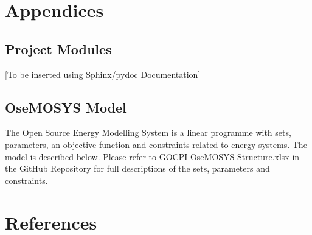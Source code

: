 \documentclass[12pt]{article}
\begin{document}
\newpage
\section{Appendices}
\subsection{Project Modules}\label{Docstring}
[To be inserted using Sphinx/pydoc Documentation]
\subsection{OseMOSYS Model} \label{OM}
The Open Source Energy Modelling System is a linear programme with sets, parameters, an objective function and constraints related to energy systems.
The model is described below. Please refer to GOCPI OseMOSYS Structure.xlsx in the GitHub Repository for full descriptions of the sets, parameters and constraints.

\newpage
\section{References}
\printbibliography
\end{document}

